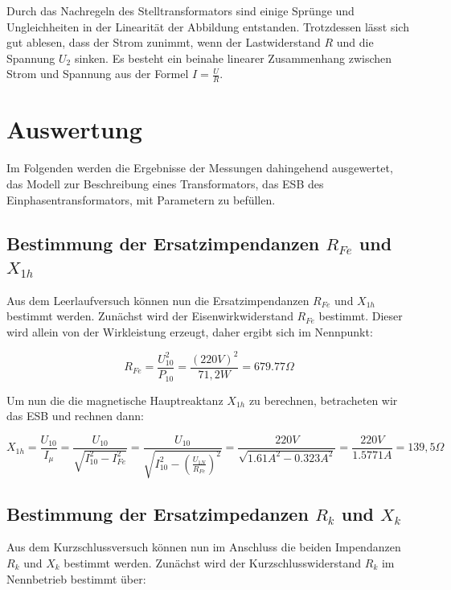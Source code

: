 \documentclass{article}
\begin{document}
Durch das Nachregeln des Stelltransformators sind einige Sprünge und Ungleichheiten in der Linearität der Abbildung entstanden. Trotzdessen lässt sich gut ablesen, dass der Strom zunimmt, wenn der Lastwiderstand $R$ und die Spannung $U_{2}$ sinken. Es besteht ein beinahe linearer Zusammenhang zwischen Strom und Spannung aus der Formel $I = \frac{U}{R}$.
\newpage
\section{Auswertung}
\label{sec:auswertung}

Im Folgenden werden die Ergebnisse der Messungen dahingehend ausgewertet, das Modell zur Beschreibung eines Transformators, das ESB des Einphasentransformators, mit Parametern zu befüllen.


\subsection{Bestimmung der Ersatzimpendanzen $R_{Fe}$ und $X_{1h}$}
\label{sec:best-der-ersatz}

Aus dem Leerlaufversuch können nun die Ersatzimpendanzen $R_{Fe}$ und $X_{1h}$ bestimmt werden. Zunächst wird der Eisenwirkwiderstand $R_{Fe}$ bestimmt. Dieser wird allein von der Wirkleistung erzeugt, daher ergibt sich im Nennpunkt:

\begin{equation*}
  R_{Fe} = \frac{U_{10}^{2}}{P_{10}} = \frac{(220V)^{2}}{71,2W} = 679.77\Omega
\end{equation*}

Um nun die die magnetische Hauptreaktanz $X_{1h}$ zu berechnen, betracheten wir das ESB und rechnen dann:

\begin{equation*}
  X_{1h} = \frac{U_{10}}{I_{\mu}} = \frac{U_{10}}{\sqrt{I_{10}^{2}-I_{Fe}^{2}}} = \frac{U_{10}}{\sqrt{I_{10}^{2}-\left(\frac{U_{1N}}{R_{Fe}}\right)^{2}}} = \frac{220V}{\sqrt{1.61A^{2}-0.323A^{2}}} = \frac{220V}{1.5771A} = 139,5\Omega
\end{equation*}

\subsection{Bestimmung der Ersatzimpedanzen $R_{k}$ und $X_{k}$}
\label{sec:best-der-ersatz-1}

Aus dem Kurzschlussversuch können nun im Anschluss die beiden Impendanzen $R_{k}$ und $X_{k}$ bestimmt werden. Zunächst wird der Kurzschlusswiderstand $R_{k}$ im Nennbetrieb bestimmt über:
\end{document}
